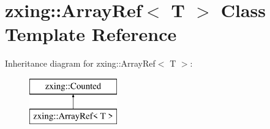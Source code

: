 \hypertarget{classzxing_1_1_array_ref}{}\section{zxing\+:\+:Array\+Ref$<$ T $>$ Class Template Reference}
\label{classzxing_1_1_array_ref}
Inheritance diagram for zxing\+:\+:Array\+Ref$<$ T $>$\+:\begin{figure}[H]
\begin{center}
\leavevmode
\includegraphics[height=2.000000cm]{classzxing_1_1_array_ref}
\end{center}
\end{figure}

